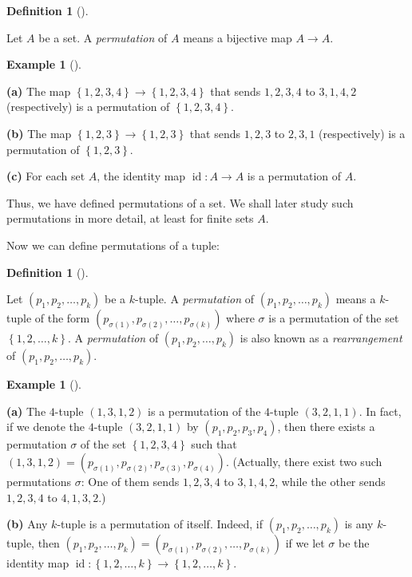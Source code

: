\documentclass[numbers=enddot,12pt,final,onecolumn,notitlepage]{scrartcl}%
\numberwithin{exer}{subsection}
\theoremstyle{definition}
\newtheorem{defi}[theo]{Definition}
\newenvironment{definition}[1][]
{\begin{defi}[#1]\begin{leftbar}}
{\end{leftbar}\end{defi}}
\newtheorem{exam}[theo]{Example}
\newenvironment{example}[1][]
{\begin{exam}[#1]\begin{leftbar}}
{\end{leftbar}\end{exam}}
\begin{document}
\begin{definition}
\label{def.comb.tuples.perm-set}Let $A$ be a set. A \textit{permutation} of
$A$ means a bijective map $A\rightarrow A$.
\end{definition}

\begin{example}
\textbf{(a)} The map $\left\{  1,2,3,4\right\}  \rightarrow\left\{
1,2,3,4\right\}  $ that sends $1,2,3,4$ to $3,1,4,2$ (respectively) is a
permutation of $\left\{  1,2,3,4\right\}  $.

\textbf{(b)} The map $\left\{  1,2,3\right\}  \rightarrow\left\{
1,2,3\right\}  $ that sends $1,2,3$ to $2,3,1$ (respectively) is a permutation
of $\left\{  1,2,3\right\}  $.

\textbf{(c)} For each set $A$, the identity map $\operatorname*{id}%
:A\rightarrow A$ is a permutation of $A$.
\end{example}

Thus, we have defined permutations of a set. We shall later study such
permutations in more detail, at least for finite sets $A$.

Now we can define permutations of a tuple:

\begin{definition}
\label{def.comb.tuples.perm-tup}Let $\left(  p_{1},p_{2},\ldots,p_{k}\right)
$ be a $k$-tuple. A \textit{permutation} of $\left(  p_{1},p_{2},\ldots
,p_{k}\right)  $ means a $k$-tuple of the form $\left(  p_{\sigma\left(
1\right)  },p_{\sigma\left(  2\right)  },\ldots,p_{\sigma\left(  k\right)
}\right)  $ where $\sigma$ is a permutation of the set $\left\{
1,2,\ldots,k\right\}  $. A \textit{permutation} of $\left(  p_{1},p_{2}%
,\ldots,p_{k}\right)  $ is also known as a \textit{rearrangement} of $\left(
p_{1},p_{2},\ldots,p_{k}\right)  $.
\end{definition}

\begin{example}
\textbf{(a)} The $4$-tuple $\left(  1,3,1,2\right)  $ is a permutation of the
$4$-tuple $\left(  3,2,1,1\right)  $. In fact, if we denote the $4$-tuple
$\left(  3,2,1,1\right)  $ by $\left(  p_{1},p_{2},p_{3},p_{4}\right)  $, then
there exists a permutation $\sigma$ of the set $\left\{  1,2,3,4\right\}  $
such that $\left(  1,3,1,2\right)  =\left(  p_{\sigma\left(  1\right)
},p_{\sigma\left(  2\right)  },p_{\sigma\left(  3\right)  },p_{\sigma\left(
4\right)  }\right)  $. (Actually, there exist two such permutations $\sigma$:
One of them sends $1,2,3,4$ to $3,1,4,2$, while the other sends $1,2,3,4$ to
$4,1,3,2$.)

\textbf{(b)} Any $k$-tuple is a permutation of itself. Indeed, if $\left(
p_{1},p_{2},\ldots,p_{k}\right)  $ is any $k$-tuple, then $\left(  p_{1}%
,p_{2},\ldots,p_{k}\right)  =\left(  p_{\sigma\left(  1\right)  }%
,p_{\sigma\left(  2\right)  },\ldots,p_{\sigma\left(  k\right)  }\right)  $ if
we let $\sigma$ be the identity map $\operatorname*{id}:\left\{
1,2,\ldots,k\right\}  \rightarrow\left\{  1,2,\ldots,k\right\}  $.
\end{example}
\end{document}
